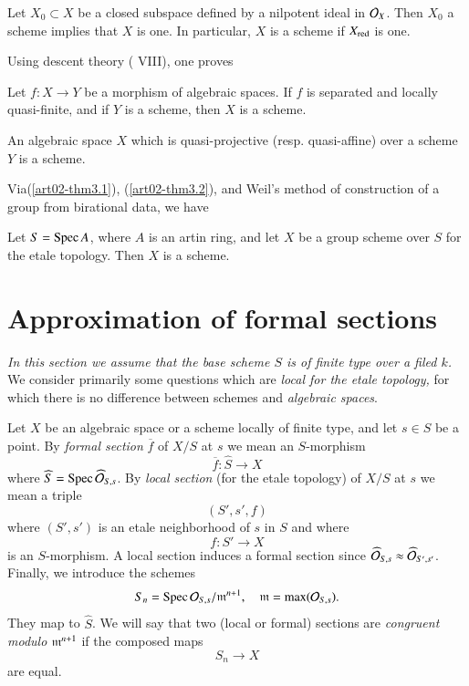 \begin{theorem}\label{art02-thm3.2}
Let $X_{0}\subset X$ be a closed subspace defined by a nilpotent ideal in $\mathcal{O}_{X}$. Then $X_{0}$ a scheme implies that $X$ is one. In particular, $X$ is a scheme if $X_{\operatorname{\mathrm{red}}}$ is one.
\end{theorem}

Using descent theory (\cite{art02-key14} VIII), one proves

\begin{theorem}\label{art02-thm3.3}
Let $f:X\to Y$ be a morphism of algebraic spaces. If $f$ is separated and locally quasi-finite, and if $Y$ is a scheme, then $X$ is a scheme.
\end{theorem}

\begin{corollary}\label{art02-coro3.4}
An algebraic space $X$ which is quasi-projective (resp. quasi-affine) over a scheme $Y$ is a scheme.
\end{corollary}

Via\pageoriginale (\ref{art02-thm3.1}), (\ref{art02-thm3.2}), and Weil's method \cite{art02-key34} of construction of a group from birational data, we have

\begin{theorem}\label{art02-thm3.5}
Let $S=\operatorname{\mathrm{Spec}} A$, where $A$ is an artin ring, and let $X$ be a group scheme over $S$ for the etale topology. Then $X$ is a scheme.
\end{theorem}

\section{Approximation of formal sections}\label{art02-sec4}

{\em In this section we assume that the base scheme $S$ is of finite type over a filed $k$.} We consider primarily some questions which are {\em local for the etale topology,} for which there is no difference between schemes and {\em algebraic spaces}.

Let $X$ be an algebraic space or a scheme locally of finite type, and let $s\in S$ be a point. By {\em formal section} $\overline{f}$ of $X/S$ at $s$ we mean an $S$-morphism
$$
\overline{f}:\widehat{S}\to X
$$
where $\widehat{S}=\operatorname{\mathrm{Spec}} \widehat{\mathcal{O}}_{S,s}$. By {\em local section} (for the etale topology) of $X/S$ at $s$ we mean a triple
$$
(S',s',f)
$$
where $(S',s')$ is an etale neighborhood of $s$ in $S$ and where
$$
f:S'\to X
$$
is an $S$-morphism. A local section induces a formal section since $\widehat{\mathcal{O}}_{S,s}\approx \widehat{\mathcal{O}}_{S',s'}$. Finally, we introduce the schemes
$$
S_{n}=\operatorname{\mathrm{Spec}} \mathcal{O}_{S,s}/\mathfrak{m}^{n+1},\quad\mathfrak{m}=\max(\mathcal{O}_{S,s}).
$$
They map to $\widehat{S}$. We will say that two (local or formal) sections are {\em congruent modulo} $\mathfrak{m}^{n+1}$ if the composed maps
$$
S_{n}\to X
$$
are equal.

